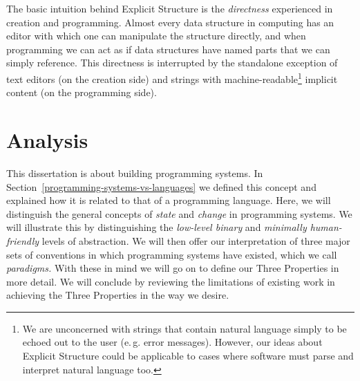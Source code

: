 \documentclass[ twoside,openright,titlepage,numbers=noenddot,headinclude,footinclude,cleardoublepage=empty,abstract=on,
                BCOR=5mm,paper=a4,fontsize=11pt
                ]{scrreprt}
\newcommand{\eg}{e.\,g.}
\newcommand{\joel}[1]{}
\theoremstyle{definition}
\begin{document}
The basic intuition behind Explicit Structure is the \emph{directness}
experienced in creation and programming. Almost every data structure in
computing has an editor with which one can manipulate the structure
directly, and when programming we can act as if data structures have
named parts that we can simply reference. This directness is interrupted
by the standalone exception of text editors (on the creation side) and
strings with machine-readable\footnote{We are unconcerned with strings
  that contain natural language simply to be echoed out to the user
  (\eg{} error messages). However, our ideas about Explicit Structure
  could be applicable to cases where software must parse and interpret
  natural language too.} implicit content (on the programming side).
\clearpage{}
\cleardoublepage
\clearpage{}\joel{ Stories (reminder)
1. Bootstrapping self-sustaining systems from a starting point
2. Fixing/freeing the COLA work by lifting the text restriction
3. Re-building the software stack with the benefit of hindsight and better tech.
}

\hypertarget{analysis}{\chapter{Analysis}\label{analysis}}

\joel{
To begin we must explain sys vs languages.
Now we can cover the COLA programming system design including the Id object model.
This introduces self-sustainability, bootstrapping, and notational freedom.
On the latter: here's why COLA's text reliance is a liability.
But why is all this so hard? / big picture: Against Conv Wisdom.
}
\joel{
Having introduced the relevant background knowledge for the dissertation, we will define concepts that we will repeatedly use and the ideas on which they depend. Some of these concepts will already exist, in which case we may use established terms or define new ones as necessary. Others will be novel concepts or interpretations of existing ideas.
}

This dissertation is about building programming systems. In
Section~\ref{programming-systems-vs-languages} we defined this concept
and explained how it is related to that of a programming language. Here,
we will distinguish the general concepts of \emph{state} and
\emph{change} in programming systems. We will illustrate this by
distinguishing the \emph{low-level binary} and \emph{minimally
human-friendly} levels of abstraction. We will then offer our
interpretation of three major sets of conventions in which programming
systems have existed, which we call \emph{paradigms.} With these in mind
we will go on to define our Three Properties in more detail. We will
conclude by reviewing the limitations of existing work in achieving the
Three Properties in the way we desire.
\end{document}
